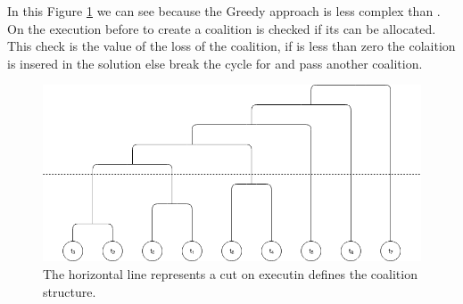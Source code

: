\newpage
In this Figure \ref{fig:CF_graph} we can see because the Greedy approach is less
complex than \sps. On the execution before to create a coalition is checked if its can 
be allocated. This check is the value of the loss of the coalition, if is less than zero
the colaition is insered in the solution else break the cycle for and pass another coalition.  

\begin{figure} [hbt]
    \centering
    \includegraphics[width=\textwidth]{img/CF.png}
    \caption{The horizontal line represents a cut on executin defines the coalition structure.}
    \label{fig:CF_graph}
\end{figure}

